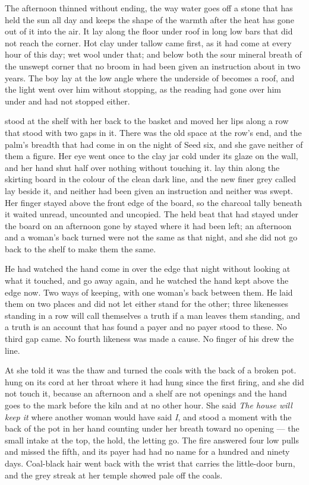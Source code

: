 The afternoon thinned without ending, the way water goes off a stone that has held the sun all day and keeps the shape of the warmth after the heat has gone out of it into the air. It lay along the floor under  roof in long low bars that did not reach the corner. Hot clay under tallow came first, as it had come at every hour of this day; wet wool under that; and below both the sour mineral breath of the unswept corner that no broom in  had been given an instruction about in two years. The boy lay at the low angle where the underside of  becomes a roof, and the light went over him without stopping, as the reading had gone over him under  and had not stopped either.

 stood at the shelf with her back to the basket and moved her lips along a row that stood with two gaps in it. There was the old space at the row's end, and the palm's breadth that had come in on the night of Seed six, and she gave neither of them a figure. Her eye went once to the clay jar cold under its glaze on the wall, and her hand shut half over nothing without touching it.  lay thin along the skirting board in the colour of the clean dark line, and the new finer grey called  lay beside it, and neither had been given an instruction and neither was swept. Her finger stayed above the front edge of the board, so the charcoal tally beneath it waited unread, uncounted and uncopied. The held beat that had stayed under the board on an afternoon gone by stayed where it had been left; an afternoon and a woman's back turned were not the same as that night, and she did not go back to the shelf to make them the same.

He had watched the hand come in over the edge that night without looking at what it touched, and go away again, and he watched the hand kept above the edge now. Two ways of keeping, with one woman's back between them. He laid them on two places and did not let either stand for the other; three likenesses standing in a row will call themselves a truth if a man leaves them standing, and a truth is an account that has found a payer and no payer stood to these. No third gap came. No fourth likeness was made a cause. No finger of his drew the line.

At  she told  it was the thaw and turned the coals with the back of a broken pot.  hung on its cord at her throat where it had hung since the first firing, and she did not touch it, because an afternoon and a shelf are not openings and the hand goes to the mark before the kiln and at no other hour. She said \emph{The house will keep it} where another woman would have said \emph{I}, and stood a moment with the back of the pot in her hand counting under her breath toward no opening --- the small intake at the top, the hold, the letting go. The fire answered four low pulls and missed the fifth, and its payer had had no name for a hundred and ninety days. Coal-black hair went back with the wrist that carries the little-door burn, and the grey streak at her temple showed pale off the coals.

